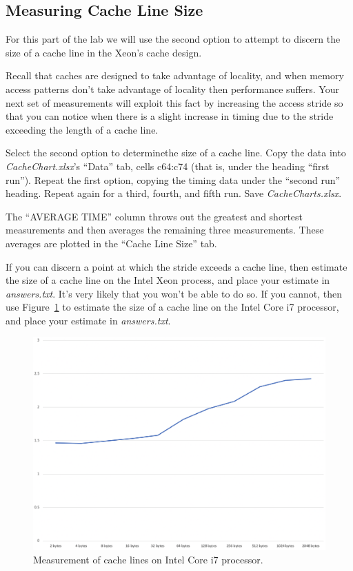 \subsection{Measuring Cache Line Size}

For this part of the lab we will use the second option to attempt to discern the
size of a cache line in the Xeon's cache design.

Recall that caches are designed to take advantage of locality, and when memory
access patterns don't take advantage of locality then performance suffers. Your
next set of measurements will exploit this fact by increasing the access stride
so that you can notice when there is a slight increase in timing due to the
stride exceeding the length of a cache line.

Select the second option to determinethe size of a cache line. Copy the data
into \textit{CacheChart.xlsx}'s ``Data'' tab, cells c64:c74 (that is, under the
heading ``first run''). Repeat the first option, copying the timing data under
the ``second run'' heading. Repeat again for a third, fourth, and fifth run.
Save \textit{CacheCharts.xlsx}.

The ``AVERAGE TIME'' column throws out the greatest and shortest measurements
and then averages the remaining three measurements. These averages are plotted
in the ``Cache Line Size'' tab.

If you can discern a point at which the stride exceeds a cache line, then
estimate the size of a cache line on the Intel Xeon process, and place your
estimate in \textit{answers.txt}. It's very likely that you won't be able to do
so. If you cannot, then use Figure~\ref{fig:LaptopCacheLine} to estimate the
size of a cache line on the Intel Core i7 processor, and place your estimate in
\textit{answers.txt}.

\begin{figure}
    \centering
    \includegraphics[width=13cm]{IntelI7cacheLine}
    \caption{Measurement of cache lines on Intel Core i7 processor. \label{fig:LaptopCacheLine}}
\end{figure}

